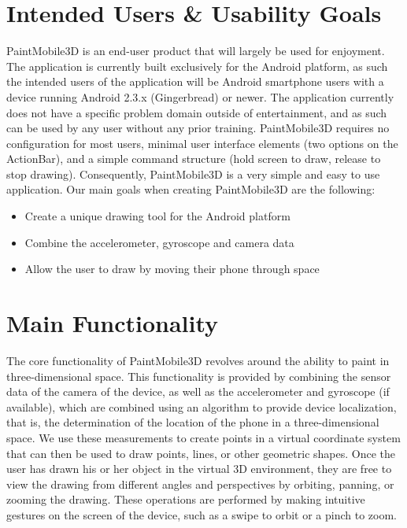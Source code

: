 \documentclass{chi-ext}
\begin{document}
\pagebreak

\section{Intended Users \& Usability Goals}

PaintMobile3D is an end-user product that will largely be used for enjoyment. The application is currently built exclusively for the Android platform, as such the intended users of the application will be Android smartphone users with a device running Android 2.3.x (Gingerbread) or newer. The application currently does not have a specific problem domain outside of entertainment, and as such can be used by any user without any prior training. PaintMobile3D requires no configuration for most users, minimal user interface elements (two options on the ActionBar), and a simple command structure (hold screen to draw, release to stop drawing). Consequently, PaintMobile3D is a very simple and easy to use application. Our main goals when creating PaintMobile3D are the following:

\begin{itemize}
\item
Create a unique drawing tool for the Android platform
\item
Combine the accelerometer, gyroscope and camera data
\item
Allow the user to draw by moving their phone through space
\end{itemize}

\section{Main Functionality}

The core functionality of PaintMobile3D revolves around the ability to paint in three-dimensional space. This functionality is provided by combining the sensor data of the camera of the device, as well as the accelerometer and gyroscope (if available), which are combined using an algorithm to provide device localization, that is, the determination of the location of the phone in a three-dimensional space. We use these measurements to create points in a virtual coordinate system that can then be used to draw points, lines, or other geometric shapes. Once the user has drawn his or her object in the virtual 3D environment, they are free to view the drawing from different angles and perspectives by orbiting, panning, or zooming the drawing. These operations are performed by making intuitive gestures on the screen of the device, such as a swipe to orbit or a pinch to zoom.
\end{document}
